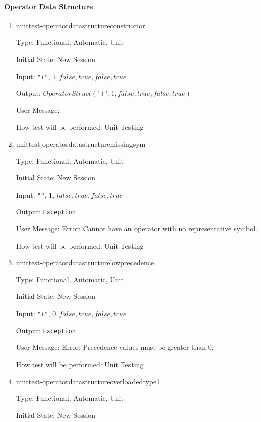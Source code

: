 \documentclass[12pt, titlepage]{article}
\begin{document}
\paragraph{Operator Data Structure}
\begin{enumerate}
	
	\item{unittest-operatordatastructureconstructor}
	
	Type: Functional, Automatic, Unit
	
	Initial State: New Session
	
	Input: \texttt{"+"}, $1, false, true, false, true$
	
	Output: $OperatorStruct(\texttt{"+"},1,false,true,false,true)$
	
	User Message: - 
	
	How test will be performed: Unit Testing\\
	
	\item{unittest-operatordatastructuremissingsym}
	
	Type: Functional, Automatic, Unit
	
	Initial State: New Session
	
	Input: \texttt{""}, $1, false, true, false, true$
	
	Output: \texttt{Exception}
	
	User Message: Error: Cannot have an operator with no representative symbol.
	
	How test will be performed: Unit Testing\\
	
	\item{unittest-operatordatastructurelowprecedence}
	
	Type: Functional, Automatic, Unit
	
	Initial State: New Session
	
	Input: \texttt{"+"}, $0, false, true, false, true$
	
	Output: \texttt{Exception}
	
	User Message: Error: Precedence values must be greater than 0.
	
	How test will be performed: Unit Testing\\
	
	\item{unittest-operatordatastructureoverloadedtype1}
	
	Type: Functional, Automatic, Unit
	
	Initial State: New Session
	

\end{enumerate}
\end{document}
